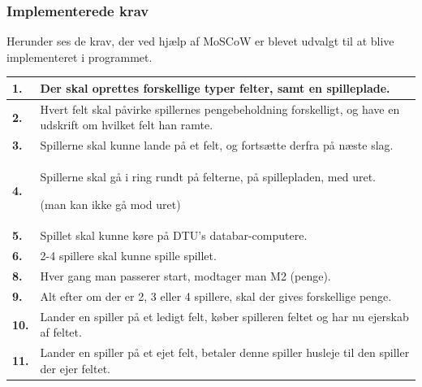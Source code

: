     \pagebreak
\subsubsection{Implementerede krav}

Herunder ses de krav, der ved hjælp af MoSCoW er blevet udvalgt til at blive implementeret i programmet. \\

\begin{tabular}{| l |p{13cm}|}

    \hline
    \textbf{1.} 
    &
    Der skal oprettes forskellige typer felter, samt en spilleplade. \\
    
    \hline
    \textbf{2.} 
    &
    Hvert felt skal påvirke spillernes pengebeholdning forskelligt, og have en udskrift om hvilket felt han ramte. \\
    
    \hline
    \textbf{3.} 
    &
    Spillerne skal kunne lande på et felt, og fortsætte derfra på næste slag. \\
    
    \hline
    \textbf{4.} 
    &
    Spillerne skal gå i ring rundt på felterne, på spillepladen, med uret. 

    (man kan ikke gå mod uret) \\
    
    \hline
    \textbf{5.} 
    &
    Spillet skal kunne køre på DTU’s databar-computere. \\
    
    \hline
    \textbf{6.} 
    &
    2-4 spillere skal kunne spille spillet. \\
      
    \hline
    \textbf{8.}
    &
    Hver gang man passerer start, modtager man M2 (penge). \\
      
    \hline
    \textbf{9.}
    &
    Alt efter om der er 2, 3 eller 4 spillere, skal der gives forskellige penge. \\
      
    \hline
    \textbf{10.}
    &
    Lander en spiller på et ledigt felt, køber spilleren feltet og har nu ejerskab af feltet. \\
      
    \hline
    \textbf{11.}
    &
    Lander en spiller på et ejet felt, betaler denne spiller husleje til den spiller der ejer feltet. \\
      

\end{tabular}
